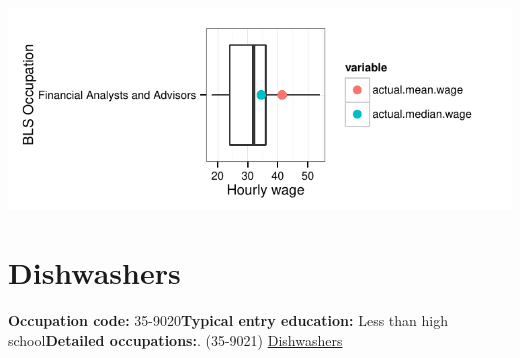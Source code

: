 \documentclass[a4paper,10pt]{article}\usepackage[]{graphicx}\usepackage[]{color}
\makeatletter
\def\maxwidth{ %
  \ifdim\Gin@nat@width>\linewidth
    \linewidth
  \else
    \Gin@nat@width
  \fi
}
\makeatother
\begin{document}
{\centering \includegraphics[width=\maxwidth]{figure/unnamed-chunk-265} 

}


\newpage\section{Dishwashers}\textbf{Occupation code:} 35-9020\newline\textbf{Typical entry education:} Less than high school\newline\textbf{Detailed occupations:}. (35-9021)  \href{http://www.bls.gov/oes/current/oes359021.htm}{Dishwashers}\newline%
\end{document}
